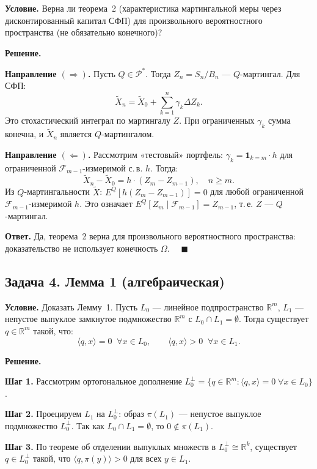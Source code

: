 \documentclass[12pt,a4paper]{article}
\theoremstyle{zadacha}
\begin{document}
\textbf{Условие.} Верна ли теорема~2 (характеристика мартингальной меры через дисконтированный капитал СФП) для произвольного вероятностного пространства (не обязательно конечного)?

\medskip
\textbf{Решение.}

\textbf{Направление $(\Rightarrow)$.} Пусть $Q \in \mathcal{P}^*$. Тогда $Z_n = S_n/B_n$ --- $Q$-мартингал. Для СФП:
\[
\tilde{X}_n = \tilde{X}_0 + \sum_{k=1}^n \gamma_k \Delta Z_k.
\]
Это стохастический интеграл по мартингалу $Z$. При ограниченных $\gamma_k$ сумма конечна, и $\tilde{X}_n$ является $Q$-мартингалом.

\textbf{Направление $(\Leftarrow)$.} Рассмотрим «тестовый» портфель: $\gamma_k = \mathbf{1}_{k=m} \cdot h$ для ограниченной $\mathcal{F}_{m-1}$-измеримой с.\,в. $h$. Тогда:
\[
\tilde{X}_n - \tilde{X}_0 = h \cdot (Z_m - Z_{m-1}), \quad n \geq m.
\]
Из $Q$-мартингальности $\tilde{X}$: $E^Q[h(Z_m - Z_{m-1})] = 0$ для любой ограниченной $\mathcal{F}_{m-1}$-измеримой $h$.
Это означает $E^Q[Z_m \mid \mathcal{F}_{m-1}] = Z_{m-1}$, т.\,е. $Z$ --- $Q$-мартингал.

\textbf{Ответ.} Да, теорема~2 верна для произвольного вероятностного пространства: доказательство не использует конечность $\Omega$. $\quad\blacksquare$

\subsection*{Задача 4. Лемма 1 (алгебраическая)}

\textbf{Условие.} Доказать Лемму~1. Пусть $L_0$ --- линейное подпространство $\mathbb{R}^m$, $L_1$ --- непустое выпуклое замкнутое подмножество $\mathbb{R}^m$ с $L_0 \cap L_1 = \emptyset$. Тогда существует $q \in \mathbb{R}^m$ такой, что:
\[
\langle q, x \rangle = 0 \;\; \forall x \in L_0, \qquad \langle q, x \rangle > 0 \;\; \forall x \in L_1.
\]

\medskip
\textbf{Решение.}

\textbf{Шаг 1.} Рассмотрим ортогональное дополнение $L_0^\perp = \{q \in \mathbb{R}^m : \langle q, x \rangle = 0 \;\forall x \in L_0\}$.

\textbf{Шаг 2.} Проецируем $L_1$ на $L_0^\perp$: образ $\pi(L_1)$ --- непустое выпуклое подмножество $L_0^\perp$. Так как $L_0 \cap L_1 = \emptyset$, то $0 \notin \pi(L_1)$.

\textbf{Шаг 3.} По теореме об отделении выпуклых множеств в $L_0^\perp \cong \mathbb{R}^k$, существует $q \in L_0^\perp$ такой, что $\langle q, \pi(y) \rangle > 0$ для всех $y \in L_1$.
\end{document}
